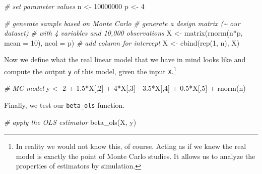 \documentclass[
  12pt,
]{style/krantz}
\newenvironment{Shaded}{\begin{snugshade}}{\end{snugshade}}
\newcommand{\AttributeTok}[1]{\textcolor[rgb]{0.77,0.63,0.00}{#1}}
\newcommand{\CommentTok}[1]{\textcolor[rgb]{0.56,0.35,0.01}{\textit{#1}}}
\newcommand{\DecValTok}[1]{\textcolor[rgb]{0.00,0.00,0.81}{#1}}
\newcommand{\FloatTok}[1]{\textcolor[rgb]{0.00,0.00,0.81}{#1}}
\newcommand{\FunctionTok}[1]{\textcolor[rgb]{0.00,0.00,0.00}{#1}}
\newcommand{\NormalTok}[1]{#1}
\newcommand{\OtherTok}[1]{\textcolor[rgb]{0.56,0.35,0.01}{#1}}
\newcommand{\SpecialCharTok}[1]{\textcolor[rgb]{0.00,0.00,0.00}{#1}}
\begin{document}
\begin{Shaded}
\begin{Highlighting}[]
\CommentTok{\# set parameter values}
\NormalTok{n }\OtherTok{\textless{}{-}} \DecValTok{10000000}
\NormalTok{p }\OtherTok{\textless{}{-}} \DecValTok{4} 

\CommentTok{\# generate sample based on Monte Carlo}
\CommentTok{\# generate a design matrix (\textasciitilde{} our \textquotesingle{}dataset\textquotesingle{}) }
\CommentTok{\# with 4 variables and 10,000 observations}
\NormalTok{X }\OtherTok{\textless{}{-}} \FunctionTok{matrix}\NormalTok{(}\FunctionTok{rnorm}\NormalTok{(n}\SpecialCharTok{*}\NormalTok{p, }\AttributeTok{mean =} \DecValTok{10}\NormalTok{), }\AttributeTok{ncol =}\NormalTok{ p)}
\CommentTok{\# add column for intercept}
\NormalTok{X }\OtherTok{\textless{}{-}} \FunctionTok{cbind}\NormalTok{(}\FunctionTok{rep}\NormalTok{(}\DecValTok{1}\NormalTok{, n), X)}
\end{Highlighting}
\end{Shaded}

Now we define what the real linear model that we have in mind looks like and compute the output \texttt{y} of this model, given the input \texttt{X}.\footnote{In reality we would not know this, of course. Acting as if we knew the real model is exactly the point of Monte Carlo studies. It allows us to analyze the properties of estimators by simulation.}

\begin{Shaded}
\begin{Highlighting}[]
\CommentTok{\# MC model}
\NormalTok{y }\OtherTok{\textless{}{-}} \DecValTok{2} \SpecialCharTok{+} \FloatTok{1.5}\SpecialCharTok{*}\NormalTok{X[,}\DecValTok{2}\NormalTok{] }\SpecialCharTok{+} \DecValTok{4}\SpecialCharTok{*}\NormalTok{X[,}\DecValTok{3}\NormalTok{] }\SpecialCharTok{{-}} \FloatTok{3.5}\SpecialCharTok{*}\NormalTok{X[,}\DecValTok{4}\NormalTok{] }\SpecialCharTok{+} \FloatTok{0.5}\SpecialCharTok{*}\NormalTok{X[,}\DecValTok{5}\NormalTok{] }\SpecialCharTok{+} \FunctionTok{rnorm}\NormalTok{(n)}
\end{Highlighting}
\end{Shaded}

Finally, we test our \texttt{beta\_ols} function.

\begin{Shaded}
\begin{Highlighting}[]
\CommentTok{\# apply the OLS estimator}
\FunctionTok{beta\_ols}\NormalTok{(X, y)}
\end{Highlighting}
\end{Shaded}
\end{document}
